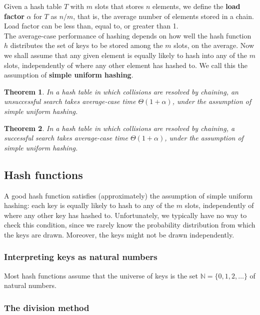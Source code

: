 \documentclass[12pt]{article}
\newtheorem{theorem}{Theorem}
\begin{document}
Given a hash table $T$ with $m$ slots that stores $n$ elements, we define the \textbf {load factor} $\alpha$ for $T$ as $n/m$, that is, the average number of elements stored in a chain. Load factor can be less than, equal to, or greater than 1. \\

The average-case performance of hashing depends on how well the hash function $h$ distributes the set of keys to be stored among the $m$ slots, on the average. Now we shall assume that any given element is equally likely to hash into any of the $m$ slots, independently of where any other element has hashed to. We call this the assumption of \textbf {simple uniform hashing}.

\begin{theorem}
  In a hash table in which collisions are resolved by chaining, an unsuccessful search takes average-case time $\Theta (1 + \alpha)$, under the assumption of simple uniform hashing.
\end{theorem}

\begin{theorem}
  In a hash table in which collisions are resolved by chaining, a successful search takes average-case time $\Theta (1 + \alpha)$, under the assumption of simple uniform hashing.
\end{theorem}

\subsection{Hash functions}

A good hash function satisfies (approximately) the assumption of simple uniform hashing: each key is equally likely to hash to any of the $m$ slots, independently of where any other key has hashed to. Unfortunately, we typically have no way to check this condition, since we rarely know the probability distribution from which the keys are drawn. Moreover, the keys might not be drawn independently.

\subsubsection*{Interpreting keys as natural numbers}

Most hash functions assume that the universe of keys is the set $\mathbb {N} = \{0,1,2,\dots \}$ of natural numbers.

\subsubsection{The division method}
\end{document}
